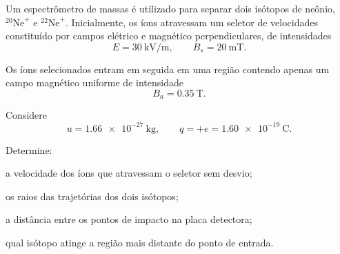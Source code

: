 \begin{questao}[4]{}


Um espectrômetro de massas é utilizado para separar dois isótopos de neônio,
$^{20}\mathrm{Ne}^{+}$ e $^{22}\mathrm{Ne}^{+}$. Inicialmente, os íons
atravessam um seletor de velocidades constituído por campos elétrico e
magnético perpendiculares, de intensidades
\[
E=\SI{30}{\kilo\volt\per\meter},
\qquad
B_s=\SI{20}{\milli\tesla}.
\]

Os íons selecionados entram em seguida em uma região contendo apenas um campo
magnético uniforme de intensidade
\[
B_a=\SI{0.35}{\tesla}.
\]

Considere
\[
u=\SI{1.66e-27}{\kilogram},
\qquad
q=+e=\SI{1.60e-19}{\coulomb}.
\]

Determine:

\begin{itensq}
    \item a velocidade dos íons que atravessam o seletor sem desvio;
    \item os raios das trajetórias dos dois isótopos;
    \item a distância entre os pontos de impacto na placa detectora;
    \item qual isótopo atinge a região mais distante do ponto de entrada.
\end{itensq}

\begin{center}
\end{center}
\end{questao}
